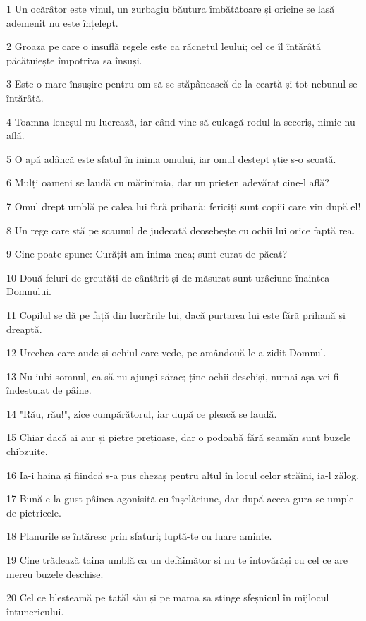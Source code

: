 \par 1 Un ocărâtor este vinul, un zurbagiu băutura îmbătătoare și oricine se lasă ademenit nu este înțelept.
\par 2 Groaza pe care o insuflă regele este ca răcnetul leului; cel ce îl întărâtă păcătuiește împotriva sa însuși.
\par 3 Este o mare însușire pentru om să se stăpânească de la ceartă și tot nebunul se întărâtă.
\par 4 Toamna leneșul nu lucrează, iar când vine să culeagă rodul la seceriș, nimic nu află.
\par 5 O apă adâncă este sfatul în inima omului, iar omul deștept știe s-o scoată.
\par 6 Mulți oameni se laudă cu mărinimia, dar un prieten adevărat cine-l află?
\par 7 Omul drept umblă pe calea lui fără prihană; fericiți sunt copiii care vin după el!
\par 8 Un rege care stă pe scaunul de judecată deosebește cu ochii lui orice faptă rea.
\par 9 Cine poate spune: Curățit-am inima mea; sunt curat de păcat?
\par 10 Două feluri de greutăți de cântărit și de măsurat sunt urâciune înaintea Domnului.
\par 11 Copilul se dă pe față din lucrările lui, dacă purtarea lui este fără prihană și dreaptă.
\par 12 Urechea care aude și ochiul care vede, pe amândouă le-a zidit Domnul.
\par 13 Nu iubi somnul, ca să nu ajungi sărac; ține ochii deschiși, numai așa vei fi îndestulat de pâine.
\par 14 "Rău, rău!", zice cumpărătorul, iar după ce pleacă se laudă.
\par 15 Chiar dacă ai aur și pietre prețioase, dar o podoabă fără seamăn sunt buzele chibzuite.
\par 16 Ia-i haina și fiindcă s-a pus chezaș pentru altul în locul celor străini, ia-l zălog.
\par 17 Bună e la gust pâinea agonisită cu înșelăciune, dar după aceea gura se umple de pietricele.
\par 18 Planurile se întăresc prin sfaturi; luptă-te cu luare aminte.
\par 19 Cine trădează taina umblă ca un defăimător și nu te întovărăși cu cel ce are mereu buzele deschise.
\par 20 Cel ce blesteamă pe tatăl său și pe mama sa stinge sfeșnicul în mijlocul întunericului.
